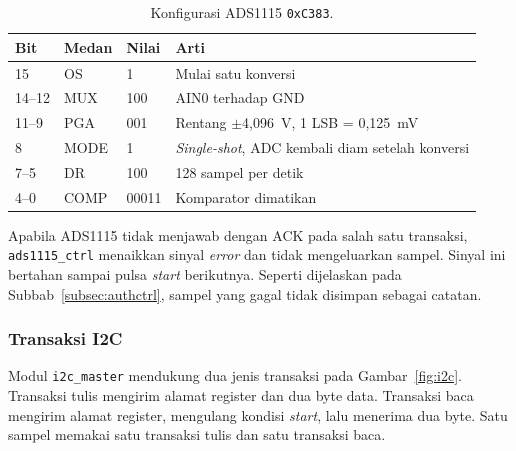 \documentclass[11pt,a4paper]{article}
\begin{document}
\begin{table}[H]
  \centering
  \small
  \begin{tabularx}{\textwidth}{l l l X}
    \toprule
    Bit & Medan & Nilai & Arti \\
    \midrule
    15 & OS & 1 & Mulai satu konversi \\
    14--12 & MUX & 100 & AIN0 terhadap GND \\
    11--9 & PGA & 001 & Rentang $\pm$4,096~V, 1 LSB = 0,125~mV \\
    8 & MODE & 1 & \textit{Single-shot}, ADC kembali diam setelah konversi \\
    7--5 & DR & 100 & 128 sampel per detik \\
    4--0 & COMP & 00011 & Komparator dimatikan \\
    \bottomrule
  \end{tabularx}
  \caption{Konfigurasi ADS1115 \texttt{0xC383}.}
  \label{tab:konfigadc}
\end{table}

Apabila ADS1115 tidak menjawab dengan ACK pada salah satu transaksi, \texttt{ads1115\_ctrl}
menaikkan sinyal \textit{error} dan tidak mengeluarkan sampel. Sinyal ini bertahan sampai pulsa
\textit{start} berikutnya. Seperti dijelaskan pada Subbab~\ref{subsec:authctrl}, sampel yang gagal
tidak disimpan sebagai catatan.

\subsubsection*{Transaksi I2C}

Modul \texttt{i2c\_master} mendukung dua jenis transaksi pada Gambar~\ref{fig:i2c}. Transaksi tulis
mengirim alamat register dan dua byte data. Transaksi baca mengirim alamat register, mengulang
kondisi \textit{start}, lalu menerima dua byte. Satu sampel memakai satu transaksi tulis dan satu
transaksi baca.
\end{document}
